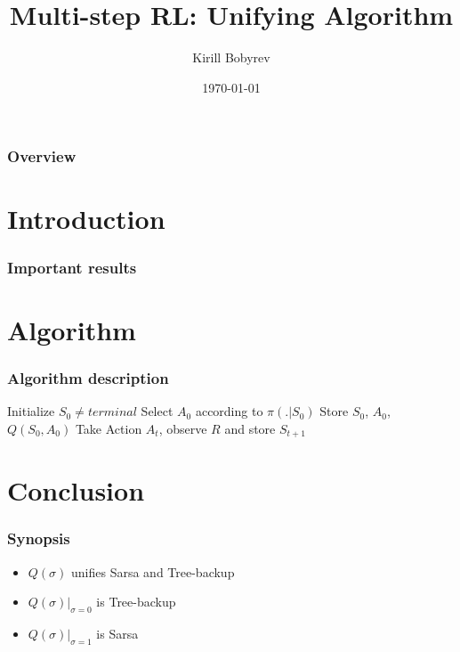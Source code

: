 \documentclass{beamer}
\title{Multi-step RL: Unifying Algorithm}
\author{Kirill Bobyrev}
\date{\today}
\begin{document}
\begin{frame}
\titlepage
\end{frame}

\begin{frame}
\frametitle{Overview}
\tableofcontents
\end{frame}


\section{Introduction}

\begin{frame}
\frametitle{Important results}
\end{frame}

\section{Algorithm}

\begin{frame}
\frametitle{Algorithm description}
\begin{algorithmic}
  \STATE Initialize $S_0 \neq {terminal}$
  \STATE Select $A_0$ according to $\pi(. | S_0)$
  \STATE Store $S_0$, $A_0$, $Q(S_0, A_0)$
      \STATE Take Action $A_t$, observe $R$ and store $S_{t + 1}$
    \ENDIF
  \ENDFOR
\end{algorithmic}
\end{frame}

\section{Conclusion}

\begin{frame}
\frametitle{Synopsis}
\begin{itemize}
    \item $Q(\sigma)$ unifies Sarsa and Tree-backup
    \item $Q(\sigma)|_{\sigma=0}$ is Tree-backup
    \item $Q(\sigma)|_{\sigma=1}$ is Sarsa
\end{itemize}
\end{frame}
\end{document}
